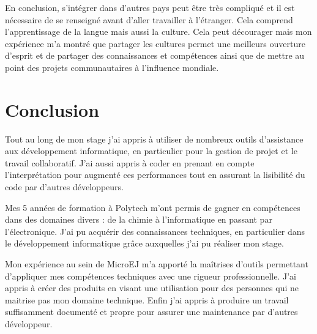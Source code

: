\documentclass[french,a4paper,12pt]{report}
\begin{document}
En conclusion, s’intégrer dans d'autres pays peut être très compliqué et il est nécessaire de se renseigné avant d'aller travailler à l'étranger. Cela comprend l'apprentissage de la langue mais aussi la culture. Cela peut décourager mais mon expérience m'a montré que partager les cultures permet une meilleurs ouverture d'esprit et de partager des connaissances et compétences ainsi que de mettre au point des projets communautaires à l'influence mondiale.

\chapter{Conclusion}

Tout au long de mon stage j’ai appris à utiliser de nombreux outils d’assistance aux développement informatique, en particulier pour la gestion de projet et le travail collaboratif. J'ai aussi appris à coder en prenant en compte l’interprétation pour augmenté ces performances tout en assurant la lisibilité du code par d'autres développeurs.

Mes 5 années de formation à Polytech m’ont permis de gagner en compétences dans des domaines divers : de la chimie à l’informatique en passant par l’électronique. J’ai pu acquérir des connaissances techniques, en particulier dans le développement informatique grâce auxquelles j'ai pu réaliser mon stage.

Mon expérience au sein de MicroEJ m’a apporté la maîtrises d'outils permettant d'appliquer mes compétences techniques avec une rigueur professionnelle. J'ai appris à créer des produits en visant une utilisation pour des personnes qui ne maitrise pas mon domaine technique. 
Enfin j'ai appris à produire un travail suffisamment documenté et propre pour assurer une maintenance par d'autres développeur.
\end{document}
